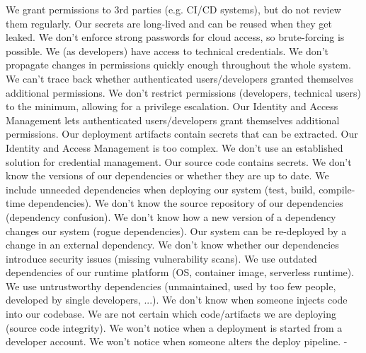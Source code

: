 %
% 
 {We grant permissions to 3rd parties (e.g. CI/CD systems), but do not review them regularly.}
 {Our secrets are long-lived and can be reused when they get leaked.}
 {We don't enforce strong passwords for cloud access, so brute-forcing is possible.}
 {We (as developers) have access to technical credentials.}
 {We don't propagate changes in permissions quickly enough throughout the whole system.}
 {We can't trace back whether authenticated users/developers granted themselves additional permissions.}
 {We don't restrict permissions (developers, technical users) to the minimum, allowing for a privilege escalation.}
 {Our Identity and Access Management lets authenticated users/developers grant themselves additional permissions.}
 {Our deployment artifacts contain secrets that can be extracted.}
 {Our Identity and Access Management is too complex.}
 {We don't use an established solution for credential management.}
 {Our source code contains secrets.}
%
 {We don't know the versions of our dependencies or whether they are up to date.}
 {We include unneeded dependencies when deploying our system (test, build, compile-time dependencies).}
 {We don't know the source repository of our dependencies (dependency confusion).}
 {We don't know how a new version of a dependency changes our system (rogue dependencies).}
 {Our system can be re-deployed by a change in an external dependency.}
 {We don't know whether our dependencies introduce security issues (missing vulnerability scans).}
 {We use outdated dependencies of our runtime platform (OS, container image, serverless runtime).}
 {We use untrustworthy dependencies (unmaintained, used by too few people, developed by single developers, ...).}
 {We don't know when someone injects code into our codebase.}
 {We are not certain which code/artifacts we are deploying (source code integrity).}
 {We won't notice when a deployment is started from a developer account.}
 {We won't notice when someone alters the deploy pipeline.}
%
 {-}
